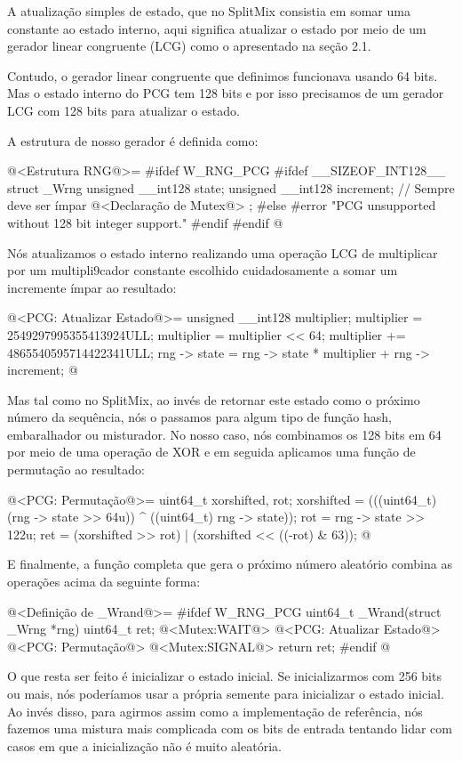 A atualização simples de estado, que no SplitMix consistia em somar
uma constante ao estado interno, aqui significa atualizar o estado por
meio de um gerador linear congruente (LCG) como o apresentado na seção
2.1.

Contudo, o gerador linear congruente que definimos funcionava usando
64 bits. Mas o estado interno do PCG tem 128 bits e por isso
precisamos de um gerador LCG com 128 bits para atualizar o estado.

A estrutura de nosso gerador é definida como:

\iniciocodigo
@<Estrutura RNG@>=
#ifdef W_RNG_PCG
#ifdef __SIZEOF_INT128__
struct _Wrng{
  unsigned __int128 state;
  unsigned __int128 increment; // Sempre deve ser ímpar
  @<Declaração de Mutex@>
};
#else
#error "PCG unsupported without 128 bit integer support."
#endif
#endif
@
\fimcodigo

Nós atualizamos o estado interno realizando uma operação LCG de
multiplicar por um multipli9cador constante escolhido cuidadosamente a
somar um incremente ímpar ao resultado:

\iniciocodigo
@<PCG: Atualizar Estado@>=
{
  unsigned __int128 multiplier;
  multiplier = 2549297995355413924ULL;
  multiplier = multiplier << 64;
  multiplier += 4865540595714422341ULL;
  rng -> state = rng -> state * multiplier + rng -> increment;
}
@
\fimcodigo

Mas tal como no SplitMix, ao invés de retornar este estado como o
próximo número da sequência, nós o passamos para algum tipo de função
hash, embaralhador ou misturador. No nosso caso, nós combinamos os 128
bits em 64 por meio de uma operação de XOR e em seguida aplicamos uma
função de permutação ao resultado:

\iniciocodigo
@<PCG: Permutação@>=
{
  uint64_t xorshifted, rot;
  xorshifted = (((uint64_t)(rng -> state >> 64u)) ^ ((uint64_t) rng -> state));
  rot = rng -> state >> 122u;
  ret = (xorshifted >> rot) | (xorshifted << ((-rot) & 63));
}
@
\fimcodigo

E finalmente, a função completa que gera o próximo número aleatório
combina as operações acima da seguinte forma:

\iniciocodigo
@<Definição de \_Wrand@>=
#ifdef W_RNG_PCG
uint64_t _Wrand(struct _Wrng *rng){
  uint64_t ret;
  @<Mutex:WAIT@>
  @<PCG: Atualizar Estado@>
  @<PCG: Permutação@>
  @<Mutex:SIGNAL@>
  return ret;
}
#endif
@
\fimcodigo

O que resta ser feito é inicializar o estado inicial. Se
inicializarmos com 256 bits ou mais, nós poderíamos usar a própria
semente para inicializar o estado inicial. Ao invés disso, para
agirmos assim como a implementação de referência, nós fazemos uma
mistura mais complicada com os bits de entrada tentando lidar com
casos em que a inicialização não é muito aleatória.


